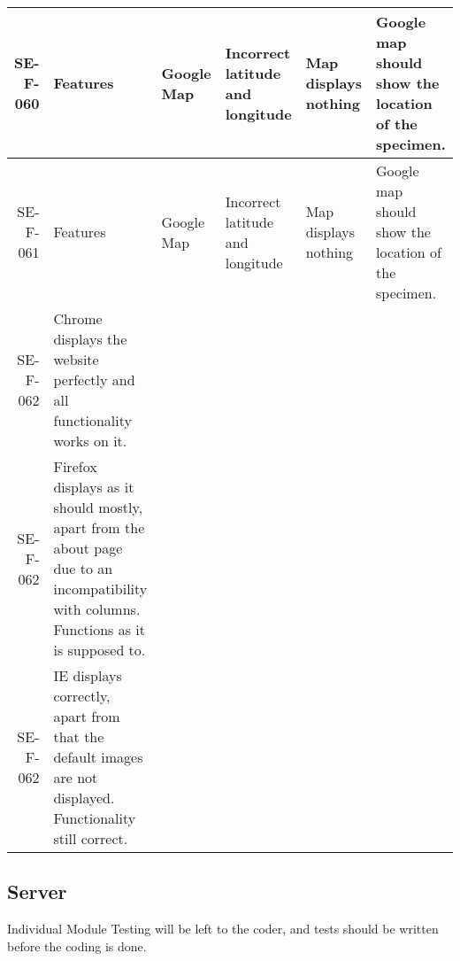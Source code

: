 \begin{landscape}
\begin{longtable}{|r|l|p{4cm}|p{4cm}|p{4cm}|p{4cm}|}
SE-F-060 & Features & Google Map & Incorrect latitude and  longitude & Map displays nothing & Google map should show the location of the specimen.& \\ \hline

SE-F-061 & Features & Google Map & Incorrect latitude and  longitude & Map displays nothing & Google map should show the location of the specimen.& \\ \hline

SE-F-062 & Chrome displays the website perfectly and all functionality works on it.& \\ \hline
		
SE-F-062 & Firefox displays as it should mostly, apart from the about page due to an incompatibility with columns. Functions as it is supposed to.& \\ \hline

SE-F-062 & IE displays correctly, apart from that the default images are not displayed. Functionality still correct.& \\ \hline
		\end{longtable}
	\end{landscape}

\subsection{Server}
	Individual Module Testing will be left to the coder, and tests should be written before the coding is done.

